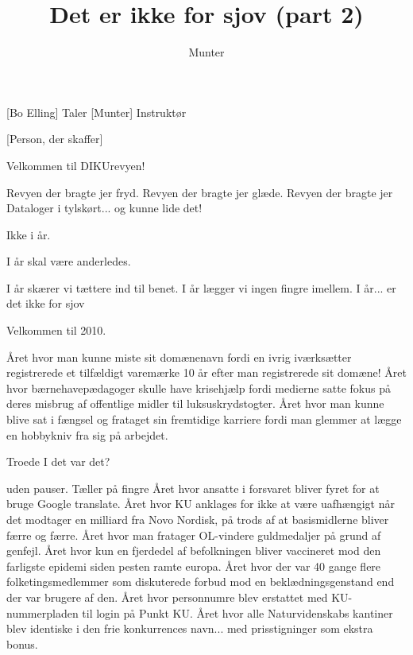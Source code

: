 \documentclass[a4paper,11pt]{article}
\title{Det er ikke for sjov (part 2)}
\author{Munter}
\begin{document}
\maketitle

\begin{roles}
[Bo Elling] Taler
[Munter] Instruktør
\end{roles}

\begin{props}
[Person, der skaffer]
\end{props}

  
\begin{sketch}

 Velkommen til DIKUrevyen!

 Revyen der bragte jer fryd.
Revyen der bragte jer glæde.
Revyen der bragte jer Dataloger i tylskørt... og kunne lide det!

 Ikke i år.

 I år skal være anderledes.

 I år skærer vi tættere ind til benet.
I år lægger vi ingen fingre imellem.
I år... er det ikke for sjov

 Velkommen til 2010.

 Året hvor man kunne miste sit domænenavn fordi en ivrig iværksætter
registrerede et tilfældigt varemærke 10 år efter man registrerede sit
domæne!
 Året hvor bærnehavepædagoger skulle have krisehjælp fordi medierne
satte fokus på deres misbrug af offentlige midler til
luksuskrydstogter.
 Året hvor man kunne blive sat i fængsel og frataget sin fremtidige
karriere fordi man glemmer at lægge en hobbykniv fra sig på arbejdet.

 Troede I det var det?

\scene uden pauser. Tæller på fingre
 Året hvor ansatte i forsvaret bliver fyret for at bruge Google translate.
Året hvor KU anklages for ikke at være uafhængigt når det modtager en
milliard fra Novo Nordisk, på trods af at basismidlerne bliver færre
og færre.
 Året hvor man fratager OL-vindere guldmedaljer på grund af genfejl.
Året hvor kun en fjerdedel af befolkningen bliver vaccineret mod den
farligste epidemi siden pesten ramte europa.
 Året hvor der var 40 gange flere folketingsmedlemmer som diskuterede
forbud mod en beklædningsgenstand end der var brugere af den.
 Året hvor personnumre blev erstattet med KU-nummerpladen til login på Punkt KU.
 Året hvor alle Naturvidenskabs kantiner blev identiske i den frie
konkurrences navn... med prisstigninger som ekstra bonus.


\end{sketch}
\end{document}
